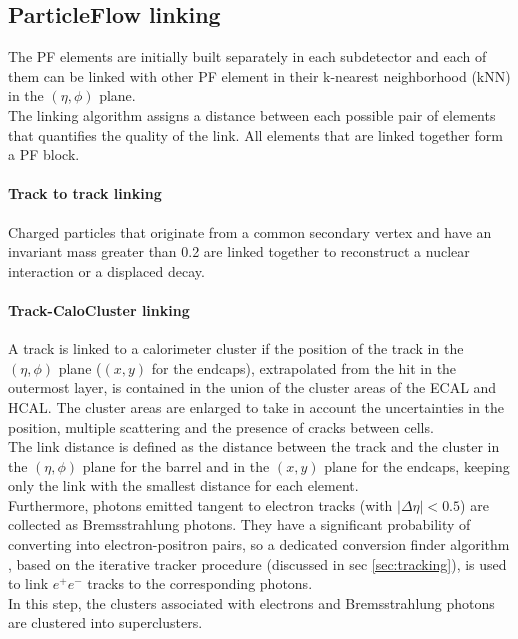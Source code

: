 \subsection{ParticleFlow linking}
The PF elements are initially built separately in each subdetector and each of them can be linked with other PF element in their k-nearest neighborhood \cite{Dasarathy1991NearestTechniques} (kNN) in the $(\eta,\phi)$ plane.\\
The linking algorithm assigns a distance between each possible pair of elements that quantifies the quality of the link. All elements that are linked together form a PF block.\\

\paragraph*{Track to track linking}
Charged particles that originate from a common secondary vertex and have an invariant mass greater than 0.2 \GeV are linked together to reconstruct a nuclear interaction or a displaced decay.

\paragraph*{Track-CaloCluster linking}
A track is linked to a calorimeter cluster if the position of the track in the $(\eta,\phi)$ plane ($(x,y)$ for the endcaps), extrapolated from the hit in the outermost layer, is contained in the union of the cluster areas of the ECAL and HCAL. The cluster areas are enlarged to take in account the uncertainties in the position, multiple scattering and the presence of cracks between cells.\\
The link distance is defined as the distance between the track and the cluster in the $(\eta,\phi)$ plane for the barrel and in the $(x,y)$ plane for the endcaps, keeping only the link with the smallest distance for each element.\\
Furthermore, photons emitted tangent to electron tracks (with $|\Delta \eta| <0.5$) are collected as Bremsstrahlung photons. They have a significant probability of converting into electron-positron pairs, so a dedicated conversion finder algorithm \cite{Sirunyan2021ElectronLHC}, based on the iterative tracker procedure (discussed in sec \ref{sec:tracking}), is used to link $e^+e^-$ tracks to the corresponding photons.\\
In this step, the clusters associated with electrons and Bremsstrahlung photons are clustered into superclusters.



